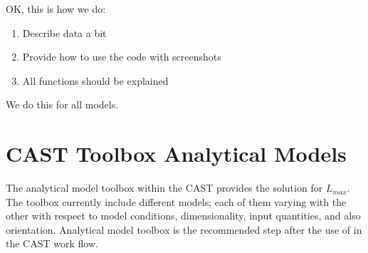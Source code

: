 \documentclass[letterpaper,10pt,english]{sphinxmanual}
\begin{document}
\sphinxAtStartPar
OK, this is how we do:
\begin{enumerate}
%
\item {} 
\sphinxAtStartPar
Describe data a bit

\item {} 
\sphinxAtStartPar
Provide how to use the code with screenshots

\item {} 
\sphinxAtStartPar
All functions should be explained

\end{enumerate}

\sphinxAtStartPar
We do this for all models.


\chapter{CAST Toolbox \sphinxhyphen{} Analytical Models}
\label{\detokenize{contents/toolbox/an_model/an_model:cast-toolbox-analytical-models}}\label{\detokenize{contents/toolbox/an_model/an_model::doc}}
\sphinxAtStartPar
The analytical model toolbox within the CAST provides the solution for \(L_{max}\). The toolbox currently include  different models; each of them varying with the other with respect to model conditions, dimensionality, input quantities, and also orientation. Analytical model toolbox is the recommended step after the use of  in the CAST work flow.
\end{document}
